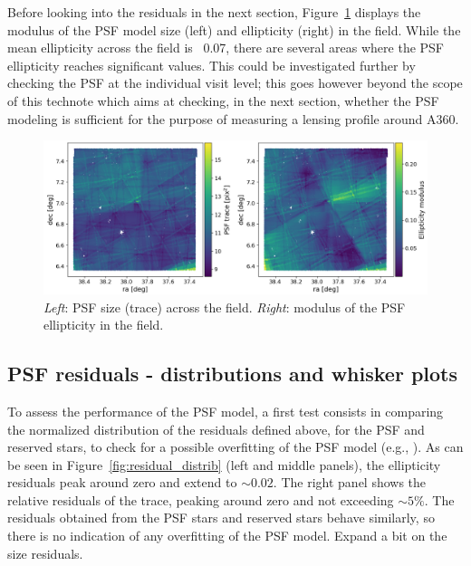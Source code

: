 \documentclass[SE,lsstdraft,authoryear,toc]{lsstdoc}
\begin{document}
Before looking into the residuals in the next section, Figure~\ref{fig:T_and_e} displays the modulus of the PSF model size (left) and ellipticity (right) in the field. While the mean ellipticity across the field is ~0.07, there are several areas where the PSF ellipticity reaches significant values. This could be investigated further by checking the PSF at the individual visit level; this goes however beyond the scope of this technote which aims at checking, in the next section, whether the PSF modeling is sufficient for the purpose of measuring a lensing profile around A360.

\begin{figure}
\centering
\includegraphics[width=\textwidth]{Figures/T_and_e.png}
\caption{\emph{Left}: PSF size (trace) across the field. \emph{Right}: modulus of the PSF ellipticity in the field. \label{fig:T_and_e}}
\end{figure}  


\subsection{PSF residuals - distributions and whisker plots}
To assess the performance of the PSF model, a first test consists in comparing the normalized distribution of the residuals defined above, for the PSF and reserved stars, to check for a possible overfitting of the PSF model (e.g., \citealp{2025OJAp....8E..26S}). As can be seen in Figure~\ref{fig:residual_distrib} (left and middle panels), the ellipticity residuals peak around zero and extend to $\sim 0.02$. The right panel shows the relative residuals of the trace, peaking around zero and not exceeding $\sim 5 \%$. The residuals obtained from the PSF stars and reserved stars behave similarly, so there is no indication of any overfitting of the PSF model.
{\color{red} Expand a bit on the size residuals.}
\end{document}
